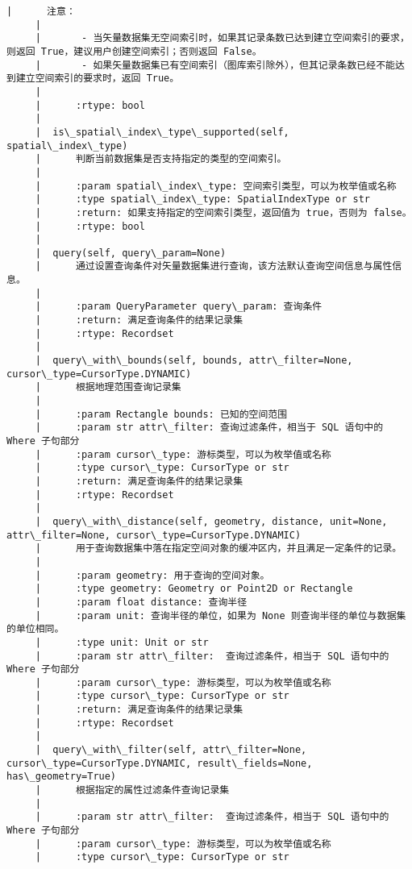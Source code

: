\documentclass[11pt]{article}
\begin{document}
\begin{Verbatim}[commandchars=\\\{\}]
     |      注意：
     |      
     |       - 当矢量数据集无空间索引时，如果其记录条数已达到建立空间索引的要求，则返回 True，建议用户创建空间索引；否则返回 False。
     |       - 如果矢量数据集已有空间索引（图库索引除外），但其记录条数已经不能达到建立空间索引的要求时，返回 True。
     |      
     |      :rtype: bool
     |  
     |  is\_spatial\_index\_type\_supported(self, spatial\_index\_type)
     |      判断当前数据集是否支持指定的类型的空间索引。
     |      
     |      :param spatial\_index\_type: 空间索引类型，可以为枚举值或名称
     |      :type spatial\_index\_type: SpatialIndexType or str
     |      :return: 如果支持指定的空间索引类型，返回值为 true，否则为 false。
     |      :rtype: bool
     |  
     |  query(self, query\_param=None)
     |      通过设置查询条件对矢量数据集进行查询，该方法默认查询空间信息与属性信息。
     |      
     |      :param QueryParameter query\_param: 查询条件
     |      :return: 满足查询条件的结果记录集
     |      :rtype: Recordset
     |  
     |  query\_with\_bounds(self, bounds, attr\_filter=None, cursor\_type=CursorType.DYNAMIC)
     |      根据地理范围查询记录集
     |      
     |      :param Rectangle bounds: 已知的空间范围
     |      :param str attr\_filter: 查询过滤条件，相当于 SQL 语句中的 Where 子句部分
     |      :param cursor\_type: 游标类型，可以为枚举值或名称
     |      :type cursor\_type: CursorType or str
     |      :return: 满足查询条件的结果记录集
     |      :rtype: Recordset
     |  
     |  query\_with\_distance(self, geometry, distance, unit=None, attr\_filter=None, cursor\_type=CursorType.DYNAMIC)
     |      用于查询数据集中落在指定空间对象的缓冲区内，并且满足一定条件的记录。
     |      
     |      :param geometry: 用于查询的空间对象。
     |      :type geometry: Geometry or Point2D or Rectangle
     |      :param float distance: 查询半径
     |      :param unit: 查询半径的单位，如果为 None 则查询半径的单位与数据集的单位相同。
     |      :type unit: Unit or str
     |      :param str attr\_filter:  查询过滤条件，相当于 SQL 语句中的 Where 子句部分
     |      :param cursor\_type: 游标类型，可以为枚举值或名称
     |      :type cursor\_type: CursorType or str
     |      :return: 满足查询条件的结果记录集
     |      :rtype: Recordset
     |  
     |  query\_with\_filter(self, attr\_filter=None, cursor\_type=CursorType.DYNAMIC, result\_fields=None, has\_geometry=True)
     |      根据指定的属性过滤条件查询记录集
     |      
     |      :param str attr\_filter:  查询过滤条件，相当于 SQL 语句中的 Where 子句部分
     |      :param cursor\_type: 游标类型，可以为枚举值或名称
     |      :type cursor\_type: CursorType or str

\end{Verbatim}
\end{document}
